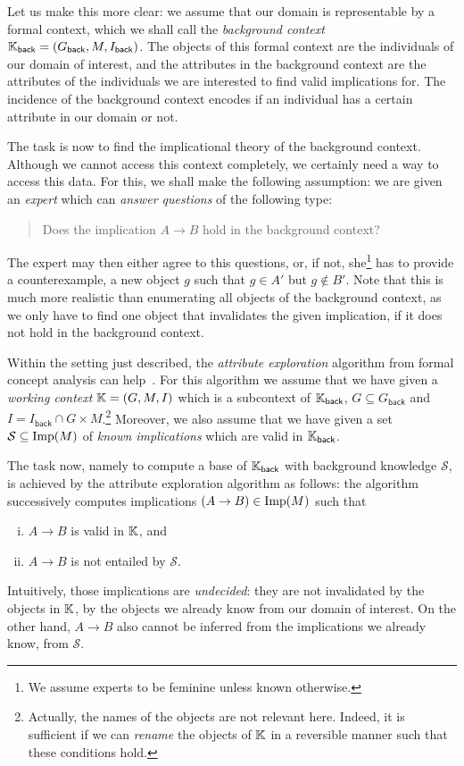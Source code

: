Let us make this more clear: we assume that our domain is representable by a formal
context, which we shall call the \emph{background context} ${\mathbb{K}}_{\mathsf{back}} =
(G_{\mathsf{back}}, M, I_{\mathsf{back}})$.  The objects of this formal context are the
individuals of our domain of interest, and the attributes in the background context are
the attributes of the individuals we are interested to find valid implications for.  The
incidence of the background context encodes if an individual has a certain attribute in
our domain or not.

The task is now to find the implicational theory of the background context.  Although we
cannot access this context completely, we certainly need a way to access this data.  For
this, we shall make the following assumption: we are given an \emph{expert} which can
\emph{answer questions} of the following type:
\begin{quote}
  Does the implication $A \to B$ hold in the background context?
\end{quote}
The expert may then either agree to this questions, or, if not, she\footnote{We assume
  experts to be feminine unless known otherwise.} has to provide a counterexample, \ie a
new object $g$ such that $g \in A'$ but $g \notin B'$.  Note that this is much more
realistic than enumerating all objects of the background context, as we only have to find
one object that invalidates the given implication, if it does not hold in the background
context.

Within the setting just described, the \emph{attribute exploration} algorithm from formal
concept analysis can help~\cite{fca-book,DBLP:conf/icfca/Ganter10}.  For this algorithm we
assume that we have given a \emph{working context} ${\mathbb{K}} = (G, M, I)$ which is a
subcontext of ${\mathbb{K}}_{\mathsf{back}}$, \ie $G \subseteq G_{\mathsf{back}}$ and $I =
I_{\mathsf{back}} \cap G \times M$.\footnote{Actually, the names of the objects are not
  relevant here.  Indeed, it is sufficient if we can \emph{rename} the objects of ${\mathbb{K}}$
  in a reversible manner such that these conditions hold.}  Moreover, we also assume that
we have given a set $\mathcal{S} \subseteq \operatorname{Imp}(M)$ of \emph{known implications} which are
valid in ${\mathbb{K}}_{\mathsf{back}}$.

The task now, namely to compute a base of ${\mathbb{K}}_{\mathsf{back}}$ with background
knowledge $\mathcal{S}$, is achieved by the attribute exploration algorithm as follows:
the algorithm successively computes implications $(A \to B) \in \operatorname{Imp}(M)$ such that
\begin{enumerate}[i. ]
\item $A \to B$ is valid in ${\mathbb{K}}$, and
\item $A \to B$ is not entailed by $\mathcal{S}$.
\end{enumerate}
Intuitively, those implications are \emph{undecided}: they are not invalidated by the
objects in ${\mathbb{K}}$, \ie by the objects we already know from our domain of interest.  On
the other hand, $A \to B$ also cannot be inferred from the implications we already know,
\ie from $\mathcal{S}$.

